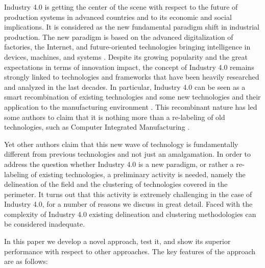\documentclass[]{book}
\begin{document}
Industry 4.0 is getting the center of the scene with respect to the
future of production systems in advanced countries and to its economic
and social implications. It is considered as the new fundamental
paradigm shift in industrial production. The new paradigm is based on
the advanced digitalization of factories, the Internet, and
future-oriented technologies bringing intelligence in devices, machines,
and systems \citep{lasi2014industry}. Despite its growing popularity and
the great expectations in terms of innovation impact, the concept of
Industry 4.0 remains strongly linked to technologies and frameworks that
have been heavily researched and analyzed in the last decades. In
particular, Industry 4.0 can be seen as a smart recombination of
existing technologies and some new technologies and their application to
the manufacturing environment \citep{trappey2016review}. This
recombinant nature has led some authors to claim that it is nothing more
than a re-labeling of old technologies, such as Computer Integrated
Manufacturing \citep{apreda2016functional}.

Yet other authors claim that this new wave of technology is
fundamentally different from previous technologies and not just an
amalgamation. In order to address the question whether Industry 4.0 is a
new paradigm, or rather a re-labeling of existing technologies, a
preliminary activity is needed, namely the delineation of the field and
the clustering of technologies covered in the perimeter. It turns out
that this activity is extremely challenging in the case of Industry 4.0,
for a number of reasons we discuss in great detail. Faced with the
complexity of Industry 4.0 existing delineation and clustering
methodologies can be considered inadequate.

In this paper we develop a novel approach, test it, and show its
superior performance with respect to other approaches. The key features
of the approach are as follows:
\end{document}
